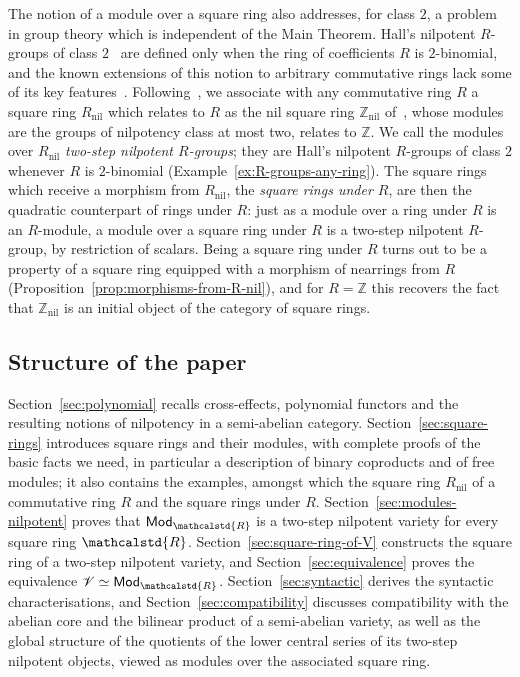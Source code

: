 \documentclass[reqno,a4paper]{amsart}
\theoremstyle{plain}
\theoremstyle{definition}
\newcommand{\V}{\ensuremath{\mathcal{V}}}
\newcommand{\R}{\ensuremath{\mathcalstd{R}}}
\newcommand{\Z}{\ensuremath{\mathbb{Z}}}
\newcommand{\Mod}{\ensuremath{\mathsf{Mod}}}
\DeclareMathOperator{\nil}{nil}
\begin{document}
The notion of a module over a square ring also addresses, for class \(2\), a problem in group theory which is independent of the Main Theorem. Hall's nilpotent \(R\)-groups of class \(2\)~\cite{Hall:Edmonton} are defined only when the ring of coefficients \(R\) is \(2\)-binomial, and the known extensions of this notion to arbitrary commutative rings lack some of its key features~\cite{MR94, IKK}. Following~\cite{P2RM}, we associate with any commutative ring \(R\) a square ring \(R_{\nil}\) which relates to \(R\) as the nil square ring \(\Z_{\nil}\) of~\cite{BHP}, whose modules are the groups of nilpotency class at most two, relates to \(\Z\). We call the modules over \(R_{\nil}\) \emph{two-step nilpotent \(R\)-groups}; they are Hall's nilpotent \(R\)-groups of class \(2\) whenever \(R\) is \(2\)-binomial (Example~\ref{ex:R-groups-any-ring}). The square rings which receive a morphism from \(R_{\nil}\), the \emph{square rings under \(R\)}, are then the quadratic counterpart of rings under \(R\): just as a module over a ring under \(R\) is an \(R\)-module, a module over a square ring under \(R\) is a two-step nilpotent \(R\)-group, by restriction of scalars. Being a square ring under \(R\) turns out to be a property of a square ring equipped with a morphism of nearrings from \(R\) (Proposition~\ref{prop:morphisms-from-R-nil}), and for \(R=\Z\) this recovers the fact that \(\Z_{\nil}\) is an initial object of the category of square rings.

\subsection*{Structure of the paper}
Section~\ref{sec:polynomial} recalls cross-effects, polynomial functors and the resulting notions of nilpotency in a semi-abelian category. Section~\ref{sec:square-rings} introduces square rings and their modules, with complete proofs of the basic facts we need, in particular a description of binary coproducts and of free modules; it also contains the examples, amongst which the square ring \(R_{\nil}\) of a commutative ring \(R\) and the square rings under \(R\). Section~\ref{sec:modules-nilpotent} proves that \(\Mod_{\R}\) is a two-step nilpotent variety for every square ring \(\R\). Section~\ref{sec:square-ring-of-V} constructs the square ring of a two-step nilpotent variety, and Section~\ref{sec:equivalence} proves the equivalence \(\V\simeq\Mod_{\R}\). Section~\ref{sec:syntactic} derives the syntactic characterisations, and Section~\ref{sec:compatibility} discusses compatibility with the abelian core and the bilinear product of a semi-abelian variety, as well as the global structure of the quotients of the lower central series of its two-step nilpotent objects, viewed as modules over the associated square ring.
\end{document}
